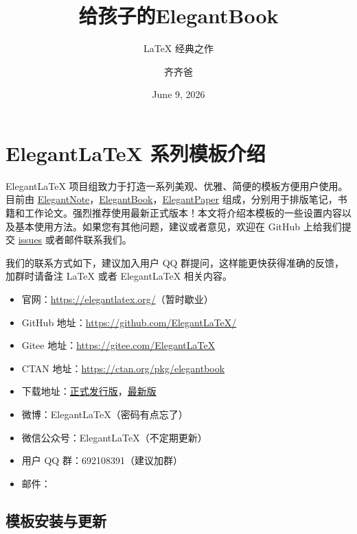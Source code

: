 \documentclass[lang=cn,10pt]{elegantbook}
\title{给孩子的ElegantBook}
\subtitle{LaTeX 经典之作}
\author{齐齐爸}
\institute{共同进步组织}
\date{June 9, 2026}
\begin{document}
\maketitle
\frontmatter

\tableofcontents

\mainmatter

\chapter{Elegant\LaTeX{} 系列模板介绍}

Elegant\LaTeX{} 项目组致力于打造一系列美观、优雅、简便的模板方便用户使用。目前由 \href{https://github.com/ElegantLaTeX/ElegantNote}{ElegantNote}，\href{https://github.com/ElegantLaTeX/ElegantBook}{ElegantBook}，\href{https://github.com/ElegantLaTeX/ElegantPaper}{ElegantPaper} 组成，分别用于排版笔记，书籍和工作论文。强烈推荐使用最新正式版本！本文将介绍本模板的一些设置内容以及基本使用方法。如果您有其他问题，建议或者意见，欢迎在 GitHub 上给我们提交 \href{https://github.com/ElegantLaTeX/ElegantBook/issues}{issues} 或者邮件联系我们。

我们的联系方式如下，建议加入用户 QQ 群提问，这样能更快获得准确的反馈，加群时请备注 \LaTeX{} 或者 Elegant\LaTeX{} 相关内容。
\begin{itemize}
  \item 官网：\href{https://elegantlatex.org/}{https://elegantlatex.org/}（暂时歇业）
  \item GitHub 地址：\href{https://github.com/ElegantLaTeX/}{https://github.com/ElegantLaTeX/}
  \item Gitee 地址：\href{https://gitee.com/ElegantLaTeX}{https://gitee.com/ElegantLaTeX}
  \item CTAN 地址：\href{https://ctan.org/pkg/elegantbook}{https://ctan.org/pkg/elegantbook}
  \item 下载地址：\href{https://github.com/ElegantLaTeX/ElegantBook/releases}{正式发行版}，\href{https://github.com/ElegantLaTeX/ElegantBook/archive/master.zip}{最新版}
  \item 微博：Elegant\LaTeX{}（密码有点忘了）
  \item 微信公众号：Elegant\LaTeX{}（不定期更新）
  \item 用户 QQ 群：692108391（建议加群）
  \item 邮件：
\end{itemize}

\section{模板安装与更新}
\end{document}

